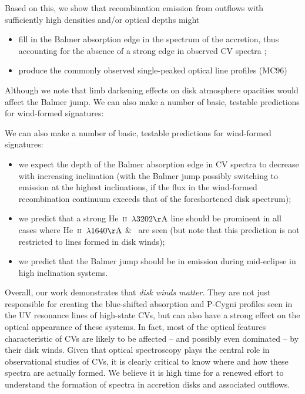 \documentclass[preprint, a4paper, 11pt]{aastex}
\begin{document}
Based on this, we
show that recombination emission from outflows with sufficiently high
densities and/or optical depths might 

\renewcommand{\labelitemi}{$\bullet$}
\begin{itemize}
	\item fill in the Balmer absorption edge in the spectrum of
          the accretion, thus accounting for the absence of a strong edge in
          observed CV spectra \citep{KLWB98};
	\item produce the commonly observed single-peaked optical line
          profiles (MC96)
\end{itemize}
\smallskip

Although we note that limb darkening effects on disk atmosphere opacities
would affect the Balmer jump. We can also make a number of basic,
testable predictions for wind-formed signatures:


\noindent We can also make a number of basic,
testable predictions for wind-formed signatures:
\begin{itemize}
	\item we expect the depth of the Balmer absorption edge in CV
          spectra to decrease with increasing inclination (with the
          Balmer jump possibly switching to emission at the highest
          inclinations, if the flux in the wind-formed recombination
          continuum exceeds that of the foreshortened disk spectrum);
	\item we predict that a strong He~\textsc{ii}~$\lambda3202{\rm
          \AA}$ line should be prominent in all cases where
          He~\textsc{ii}~$\lambda1640{\rm \AA}$ \& \heiiopt\ are seen
          (but note that this prediction is not restricted to lines
          formed in disk winds);
	\item we predict that the Balmer jump should be in emission
          during mid-eclipse in high inclination systems.
\end{itemize}

\smallskip


Overall, our work demonstrates that {\sl disk winds matter}. They are
not just responsible for creating the blue-shifted absorption and
P-Cygni profiles seen in the UV resonance lines of high-state CVs, but
can also have a strong effect on the optical appearance of these
systems. In fact, most of the optical features characteristic of CVs
are likely to be affected -- and possibly even dominated -- by their disk
winds. Given that optical spectroscopy plays the central role in
observational studies of CVs, it is clearly critical to know 
where and how these spectra are actually formed. We believe it is high
time for a renewed effort to understand the formation of spectra in
accretion disks and associated outflows. 
\end{document}
